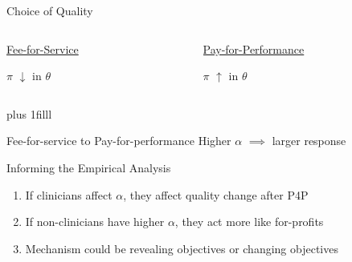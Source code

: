 \documentclass[notes,11pt, aspectratio=169]{beamer}
\newcommand{\btVFill}{\vskip0pt plus 1filll}
\begin{document}
\begin{frame}{Choice of Quality}\label{choiceofquality}

\vspace{9mm}

\Large

    \begin{columns}
    \begin{column}{0.5\textwidth}
    \begin{center}
        \underline{Fee-for-Service}

        \vspace{3mm}

            $\pi$ $\downarrow$ in $\theta$
    \end{center}
    \end{column}
    \begin{column}{0.5\textwidth}  %
    \begin{center}
        \underline{Pay-for-Performance}

        \vspace{3mm}


            $\pi$ $\uparrow$ in $\theta$
    \end{center}
    \end{column}
\end{columns}

\btVFill

\begin{block}{\Large Fee-for-service to Pay-for-performance}
    \centering
    \vspace{3mm}
    Higher $\alpha$ $\implies$ larger response

    \vspace{3mm}
\end{block}

\hyperlink{choiceofqualityapp}{}
\end{frame}

\begin{frame}{Informing the Empirical Analysis}

\large
    \begin{enumerate}
        \item If clinicians affect $\alpha$, they affect quality change after P4P

        \vspace{8mm}\pause
        \item If non-clinicians have higher $\alpha$, they act more like for-profits

        \vspace{8mm}\pause
        \item Mechanism could be revealing objectives or changing objectives
    \end{enumerate}
\end{frame}
\end{document}
